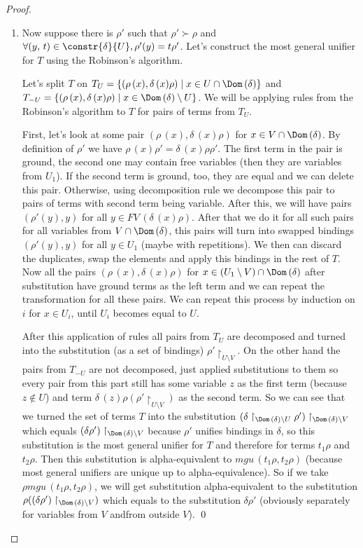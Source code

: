\begin{proof}
\begin{enumerate}
\item Now suppose there is $\rho'$ such that $\rho' \succ \rho$ and $\forall (y, \, t) \in \constr{\delta}{U}, \rho'(y) = t \rho'$. Let's construct the most general unifier for $T$ using the Robinson's algorithm.

Let's split $T$ on $T_U = \{ (\rho\,(x), \delta\,(x) \rho) \mid x \in U \cap \Dom\,(\delta) \}$ and $T_{-U} = \{ (\rho\,(x), \delta\,(x) \rho) \mid x \in  \Dom\,(\delta) \setminus U \}$. We will be applying rules from the Robinson's algorithm to $T$ for pairs of terms from $T_U$.

First, let's look at some pair $(\rho\,(x), \delta\,(x) \rho)$ for $x \in V \cap \Dom\,(\delta)$. By definition of $\rho'$ we have $\rho\,(x) \rho' = \delta\,(x) \rho \rho'$. The first term in the pair is ground, the second one may contain free variables (then they are variables from $U_1$). If the second term is ground, too, they are equal and we can delete this pair. Otherwise, using decomposition rule we decompose this pair to pairs of terms with second term being variable. After this, we will have pairs $(\rho'(y), y)$ for all $y \in FV\,(\delta\,(x) \rho)$. After that we do it for all such pairs for all variables from $V \cap \Dom\,(\delta)$, this pairs will turn into swapped bindings $(\rho'(y), y)$ for all $y \in U_1$ (maybe with repetitions). We then can discard the duplicates, swap the elements and apply this bindings in the rest of $T$. Now all the pairs $(\rho\,(x), \delta\,(x) \rho)$ for $x \in (U_1 \setminus V) \cap \Dom\,(\delta)$ after substitution have ground terms as the left term and we can repeat the transformation for all these pairs. We can repeat this process by induction on $i$ for $x \in U_i$, until $U_i$ becomes equal to $U$.

After this application of rules all pairs from $T_U$ are decomposed and turned into the substitution (as a set of bindings) $\rho'\restriction_{U \setminus V}$. On the other hand the pairs from $T_{-U}$  are not decomposed, just applied substitutions to them so every pair from this part still has some variable $z$ as the first term (because $z\not\in U$) and term $\delta\,(z) \rho (\rho'\restriction_{U \setminus V})$ as the second term. So we can see that we turned the set of terms $T$ into the substitution ${(\delta\restriction_{\Dom\,(\delta) \setminus U} \rho')\restriction_{\Dom\,(\delta) \setminus V}}$ which equals ${(\delta \rho')\restriction_{\Dom\,(\delta) \setminus V}}$ because $\rho'$ unifies bindings in $\delta$, so this substitution is the most general unifier for $T$ and therefore for terms $t_1 \rho$ and $t_2 \rho$. Then this substitution is alpha-equivalent to $mgu\,(t_1 \rho, t_2 \rho)$ (because most general unifiers are unique up to alpha-equivalence). So if we take $\rho mgu\,(t_1 \rho, t_2 \rho)$, we will get substitution alpha-equivalent to the substitution ${\rho ((\delta \rho')\restriction_{\Dom\,(\delta) \setminus V})}$ which equals to the substitution $\delta \rho'$ (obviously separately for variables from $V$ andfrom outside $V$).
\qed
 

\end{enumerate}
\end{proof}

